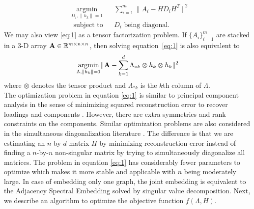 \documentclass[10pt,journal,compsoc]{IEEEtran}
\begin{document}
 \begin{equation*}
\begin{aligned}  
	& \underset{D_i,\|h_k\|=1}{\operatorname{argmin}} 
	& & \sum\limits_{i=1}^{m} \| A_i- H D_i H^T \|  ^2 \\
	& \text{ subject to} 
	& &  D_i \text{ being diagonal.}
\end{aligned}
\end{equation*}
We may also view \eqref{eq:1} as a tensor factorization problem. If $\{A_i\}_{i=1}^m$ are stacked in a 3-D array ${\bf A} \in \mathbb{R}^{m\times n \times n}$, then solving equation~\eqref{eq:1} is also equivalent to
\[  \underset{\Lambda,\|h_k\|=1}{\operatorname{argmin}}  \| {\bf A} - \sum\limits_{k=1}^{d} \Lambda_{*k} \otimes h_k \otimes h_k\|  ^2  \]
where $\otimes$ denotes the tensor product and $\Lambda_{*k}$ is the $k$th column of $\Lambda$. \\

\noindent The optimization problem in equation \eqref{eq:1} is similar to principal component analysis in the sense of minimizing squared reconstruction error to recover loadings and components \cite{jolliffe2002principal}. However, there are extra symmetries and rank constraints on the components. Similar optimization problems are also considered in the simultaneous diagonalization literature \cite{flury1986algorithm} \cite{ziehe2004fast}. The difference is that we are estimating an $n$-by-$d$ matrix $H$ by minimizing reconstruction error instead of finding a $n$-by-$n$ non-singular matrix by trying to simultaneously diagonalize all matrices. The problem in equation \eqref{eq:1} has considerably fewer parameters to optimize which makes it more stable and applicable with $n$ being moderately large. In case of embedding only one graph, the joint embedding is equivalent to the Adjacency Spectral Embedding solved by singular value decomposition\cite{sussman2012consistent}. Next, we describe an algorithm to optimize the objective function $f(\Lambda,H)$.  
\end{document}
